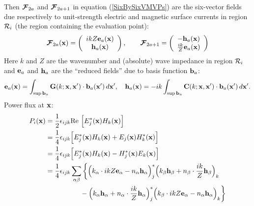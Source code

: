 \documentclass[letterpaper]{article}
\begin{document}
Then $\boldsymbol{\mathcal{F}}_{2a}$ and $\boldsymbol{\mathcal{F}}_{2a+1}$ in equation
(\ref{SixBySixVMVPs}) are the six-vector fields
due respectively to unit-strength electric and magnetic 
surface currents in region $\mathcal{R}_i$ (the region
containing the evaluation point):
\begin{align*}
  \boldsymbol{\mathcal{F}}_{2a}(\mathbf{x})
  = \left( \begin{array}{c}
    ikZ \mathbf{e}_a(\mathbf{x}) \\ \mathbf{h}_a(\mathbf{x})
    \end{array}\right), 
\qquad
  \boldsymbol{\mathcal{F}}_{2a+1} 
 = \left( \begin{array}{c}
    -\mathbf{h}_a(\mathbf{x}) \\ \frac{ik}{Z} \mathbf{e}_a(\mathbf{x})
    \end{array}\right)
\end{align*}
Here $k$ and $Z$ are the wavenumber and (absolute) 
wave impedance in region $\mathcal{R}_i$ and $\mathbf{e}_a$ and $\mathbf{h}_a$
are the ``reduced fields'' due to basis function $\mathbf{b}_a$:
$$ \mathbf{e}_a(\mathbf{x}) 
   =
   \int_{\sup \mathbf{b}_a} \mathbf{G}(k; \mathbf{x}, \mathbf{x}^\prime) 
                       \cdot \mathbf{b}_a (\mathbf{x}^\prime) 
   \, d\mathbf{x}^\prime,
   \quad
   \mathbf{h}_a(\mathbf{x}) 
   =
   -ik\int_{\sup \mathbf{b}_a} \mathbf{C}(k; \mathbf{x}, \mathbf{x}^\prime) 
                       \cdot \mathbf{b}_a (\mathbf{x}^\prime) 
   \, d\mathbf{x}^\prime.
$$
Power flux at $\mathbf{x}$:
\begin{align*}
 P_i(\mathbf{x}) 
&= 
 \frac{1}{2}\epsilon_{ijk}\text{Re }\Big[ E^*_j(\mathbf{x}) H_k(\mathbf{x}) \Big]
\\
&= 
 \frac{1}{4}\epsilon_{ijk}
 \Big[ E^*_j(\mathbf{x}) H_k(\mathbf{x}) + E_j(\mathbf{x}) H^*_k(\mathbf{x}) \Big]
\\
&=
 \frac{1}{4}\epsilon_{ijk}
 \Big[ E^*_j(\mathbf{x}) H_k(\mathbf{x}) - H^*_j(\mathbf{x}) E_k(\mathbf{x}) \Big]
\\
&=
 \frac{1}{4}\epsilon_{ijk}\sum_{\alpha\beta}
  \bigg\{ 
   \Big( k_\alpha \cdot ikZ \mathbf{e}_\alpha - n_\alpha \mathbf{h}_\alpha\Big)^*_j
   \Big( k_\beta \mathbf{h}_\beta             + n_\beta \cdot \frac{ik}{Z} \mathbf{h}_\beta\Big)_k
\\
&\hspace{0.7in}
  -
   \Big( k_\alpha \mathbf{h}_\alpha           + n_\alpha \cdot \frac{ik}{Z} \mathbf{h}_\alpha\Big)^*_j
   \Big( k_\beta \cdot ikZ \mathbf{e}_\alpha - n_\alpha \mathbf{h}_\alpha\Big)_k
  \bigg\}
\end{align*}
\end{document}
